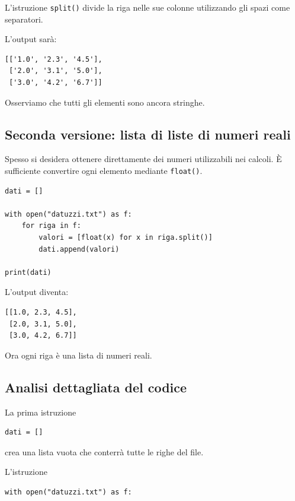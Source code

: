 \documentclass[11pt,a4paper]{book}
\begin{document}
L'istruzione \texttt{split()} divide la riga nelle sue colonne utilizzando gli spazi come separatori.

L'output sarà:

\begin{lstlisting}[style=output]
[['1.0', '2.3', '4.5'],
 ['2.0', '3.1', '5.0'],
 ['3.0', '4.2', '6.7']]
\end{lstlisting}

Osserviamo che tutti gli elementi sono ancora stringhe.

\subsection{Seconda versione: lista di liste di numeri reali}

Spesso si desidera ottenere direttamente dei numeri utilizzabili nei calcoli. È sufficiente convertire ogni elemento mediante \texttt{float()}.

\begin{lstlisting}[style=python]
dati = []

with open("datuzzi.txt") as f:
    for riga in f:
        valori = [float(x) for x in riga.split()]
        dati.append(valori)

print(dati)
\end{lstlisting}

L'output diventa:

\begin{lstlisting}[style=output]
[[1.0, 2.3, 4.5],
 [2.0, 3.1, 5.0],
 [3.0, 4.2, 6.7]]
\end{lstlisting}

Ora ogni riga è una lista di numeri reali.

\subsection{Analisi dettagliata del codice}

La prima istruzione

\begin{lstlisting}[style=python]
dati = []
\end{lstlisting}

crea una lista vuota che conterrà tutte le righe del file.

L'istruzione

\begin{lstlisting}[style=python]
with open("datuzzi.txt") as f:
\end{lstlisting}
\end{document}

